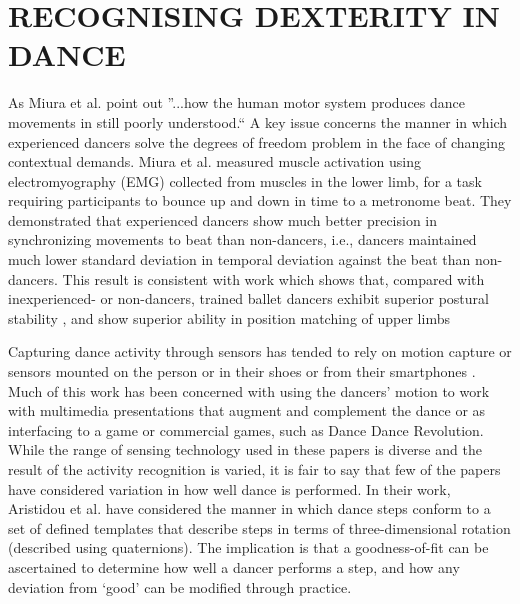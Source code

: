\documentclass{sigchi}
\begin{document}
\section{RECOGNISING DEXTERITY IN DANCE }
As Miura et al. \cite{Miura2015} point out ''...how the human motor system produces dance movements in still 
poorly understood.`` A key issue concerns the manner in which experienced dancers solve the degrees of freedom 
problem in the face of changing contextual demands.  Miura et al. \cite{Miura2013} measured muscle activation 
using electromyography (EMG) collected from muscles in the lower limb, for a task requiring participants to 
bounce up and down in time to a metronome beat.  They demonstrated that experienced dancers show much better 
precision in synchronizing movements to beat than non-dancers, i.e., dancers maintained much lower standard 
deviation in temporal deviation against the beat than non-dancers. This result is consistent with work which 
shows that, compared with inexperienced- or non-dancers, trained ballet dancers exhibit superior postural 
stability \cite{Crotts1996} %
, and show superior ability in position matching of upper limbs \cite{Ramsay2001} %





Capturing dance activity through sensors has tended to rely on motion capture 
\cite{Alexiadis2014} %
or sensors mounted on the person \cite{Lynch2005} %
or in their shoes \cite{Paradiso1997} %
or from their smartphones  \cite{Wei2014}. %
Much of this work has been concerned with using the dancers’ motion to work with 
multimedia presentations that augment and complement the dance \cite{Griffith1998, Park2006}
or as interfacing to a game \cite{Chu2012} %
or commercial games, such as Dance Dance Revolution.  
While the range of sensing technology used in these papers is diverse and the result of the activity 
recognition is varied, it is fair to say that few of the papers have considered variation in how well dance 
is performed.  In their work, Aristidou et al. \cite{Aristidou2014} %
have considered the manner in which dance steps conform to a set of defined 
templates that describe steps in terms of three-dimensional rotation (described using quaternions).  
The implication is that a goodness-of-fit can be ascertained to determine how well a dancer performs a step, 
and how any deviation from ‘good’ can be modified through practice. 
\end{document}
